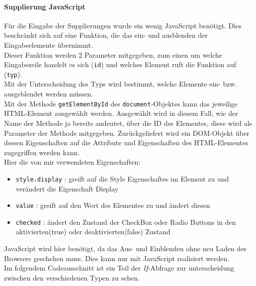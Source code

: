 \paragraph{Supplierung JavaScript} $ ~~ $\\
\label{sec:content_imple_input_java_supp}
Für die Eingabe der Supplierungen wurde ein wenig JavaScript benötigt. Dies beschränkt sich auf eine Funktion, die das ein- und ausblenden der Eingabeelemente übernimmt.\\
Dieser Funktion werden 2 Parameter mitgegeben, zum einen um welche Eingabezeile handelt es sich (\texttt{id}) und welches Element ruft die Funktion auf (\texttt{typ}).\\
Mit der Unterscheidung des Typs wird bestimmt, welche Elemente ein- bzw. ausgeblendet werden müssen.\\
Mit der Methode \texttt{getElementById} des \texttt{document}-Objektes kann das jeweilige HTML-Element ausgewählt werden. Ausgewählt wird in diesem Fall, wie der Name der Methode ja bereits andeutet, über die ID des Elementes, diese wird als Parameter der Methode mitgegeben. Zurückgeliefert wird ein DOM-Objekt über dessen Eigenschaften auf die Attribute und Eigenschaften des HTML-Elementes zugegriffen werden kann.\\
Hier die von mir verwendeten Eigenschaften:
\begin{itemize}
	\item \texttt{style.display} : greift auf die Style Eigenschaftes im Element zu und verändert die Eigenschaft Display
	\item \texttt{value} : greift auf den Wert des Elementes zu und ändert diesen
	\item \texttt{checked} : ändert den Zustand der CheckBox oder Radio Buttons in den aktivierten(true) oder deaktivierten(false) Zustand
\end{itemize}
JavaScript wird hier benötigt, da das Aus- und Einblenden ohne neu Laden des Browsers geschehen muss. Dies kann nur mit JavaScript realisiert werden.\\
Im folgendem Codeausschnitt ist ein Teil der \textit{If}-Abfrage zur unterscheidung zwischen den verschiedenen Typen zu sehen.

